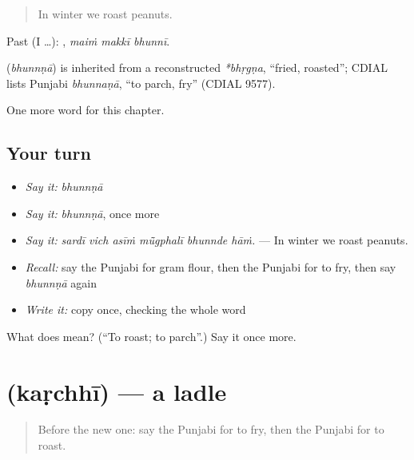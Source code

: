 \begin{quote}
In winter we roast peanuts.
\end{quote}

Past (I …):   , \emph{maiṁ makkī bhunnī}.

\begin{cousinweb}
\textbf{} (\emph{bhunnṇā}) is inherited from a reconstructed \emph{*bhṛgṇa}, \textquotedblleft{}fried, roasted\textquotedblright{}; CDIAL lists Punjabi \emph{bhunnaṇā}, \textquotedblleft{}to parch, fry\textquotedblright{} (CDIAL 9577).
\end{cousinweb}

\begin{grammarlens}[title={What you've built}]
One more word for this chapter.
\end{grammarlens}

\subsection*{Your turn}
\begin{itemize}
\raggedright
  \item \emph{Say it:} \emph{bhunnṇā}
  \item \emph{Say it:} \emph{bhunnṇā}, once more
  \item \emph{Say it:} \emph{sardī vich asīṁ mū̃gphalī bhunnde hāṁ.} — In winter we roast peanuts.
  \item \emph{Recall:} say the Punjabi for gram flour, then the Punjabi for to fry, then say \emph{bhunnṇā} again
  \item \emph{Write it:} copy \textbf{} once, checking the whole word
\end{itemize}

\begin{tcolorbox}[breakable,colback=teal!4,colframe=teal!35!black,title={Before you move on}]
What does  mean? (\textquotedblleft{}To roast; to parch\textquotedblright{}.) Say it once more.
\end{tcolorbox}
\section[\texorpdfstring{\pa{ਕੜਛੀ} (kaṛchhī)}{ਕੜਛੀ (kaṛchhī)}]{ (kaṛchhī) — a ladle}

\label{lesson:PA-C242-karchhi}



\begin{quote}
Before the new one: say the Punjabi for to fry, then the Punjabi for to roast.
\end{quote}

